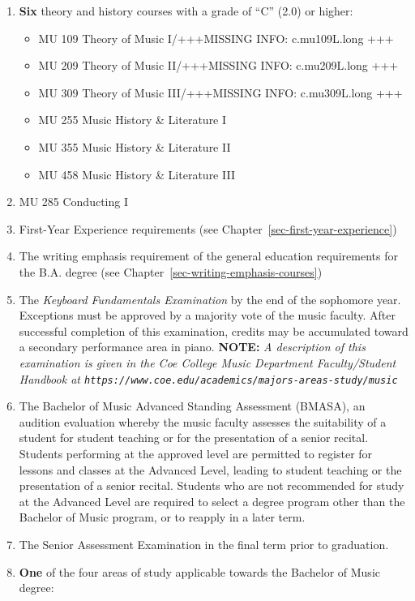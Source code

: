 \documentclass[
  letterpaper,
]{scrbook}
\providecommand{\tightlist}{%
  \setlength{\itemsep}{0pt}\setlength{\parskip}{0pt}}
\begin{document}
\begin{enumerate}
\def\labelenumi{\arabic{enumi}.}
\item
  \textbf{Six} theory and history courses with a grade of ``C'' (2.0) or
  higher:

  \begin{itemize}
  \tightlist
  \item
    MU 109 Theory of Music I/+++MISSING INFO: c.mu109L.long +++
  \item
    MU 209 Theory of Music II/+++MISSING INFO: c.mu209L.long +++
  \item
    MU 309 Theory of Music III/+++MISSING INFO: c.mu309L.long +++
  \item
    MU 255 Music History \& Literature I
  \item
    MU 355 Music History \& Literature II
  \item
    MU 458 Music History \& Literature III
  \end{itemize}
\item
  MU 285 Conducting I
\item
  First-Year Experience requirements (see
  Chapter~\ref{sec-first-year-experience})
\item
  The writing emphasis requirement of the general education requirements
  for the B.A. degree (see Chapter~\ref{sec-writing-emphasis-courses})
\item
  The \emph{Keyboard Fundamentals Examination} by the end of the
  sophomore year. Exceptions must be approved by a majority vote of the
  music faculty. After successful completion of this examination,
  credits may be accumulated toward a secondary performance area in
  piano. \textbf{NOTE:} \emph{A description of this examination is given
  in the Coe College Music Department Faculty/Student Handbook at
  \texttt{https://www.coe.edu/academics/majors-areas-study/music}}
\item
  The Bachelor of Music Advanced Standing Assessment (BMASA), an
  audition evaluation whereby the music faculty assesses the suitability
  of a student for student teaching or for the presentation of a senior
  recital. Students performing at the approved level are permitted to
  register for lessons and classes at the Advanced Level, leading to
  student teaching or the presentation of a senior recital. Students who
  are not recommended for study at the Advanced Level are required to
  select a degree program other than the Bachelor of Music program, or
  to reapply in a later term.\\
\item
  The Senior Assessment Examination in the final term prior to
  graduation.
\item
  \textbf{One} of the four areas of study applicable towards the
  Bachelor of Music degree:


\end{enumerate}
\end{document}
